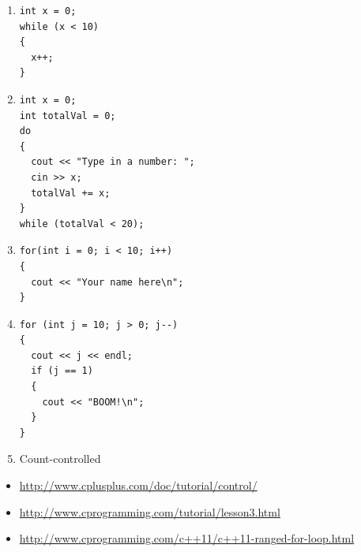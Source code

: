\begin{enumerate}

\item
\noindent\begin{minipage}{\linewidth}\begin{lstlisting}
int x = 0;
while (x < 10)
{
  x++;
} 
\end{lstlisting}\end{minipage}

\item
\noindent\begin{minipage}{\linewidth}\begin{lstlisting}
int x = 0;
int totalVal = 0;
do
{
  cout << "Type in a number: "; 
  cin >> x;
  totalVal += x;
}
while (totalVal < 20); 
\end{lstlisting}\end{minipage}

\item 
\noindent\begin{minipage}{\linewidth}\begin{lstlisting}
for(int i = 0; i < 10; i++)
{
  cout << "Your name here\n";
}
\end{lstlisting}\end{minipage}

\item
\noindent\begin{minipage}{\linewidth}\begin{lstlisting}
for (int j = 10; j > 0; j--)
{
  cout << j << endl;
  if (j == 1)
  {
    cout << "BOOM!\n";
  }
}
\end{lstlisting}\end{minipage}

\item Count-controlled

\end{enumerate}


\begin{itemize}
\item \url{http://www.cplusplus.com/doc/tutorial/control/}
\item \url{http://www.cprogramming.com/tutorial/lesson3.html}
\item \url{http://www.cprogramming.com/c++11/c++11-ranged-for-loop.html}
\end{itemize}



